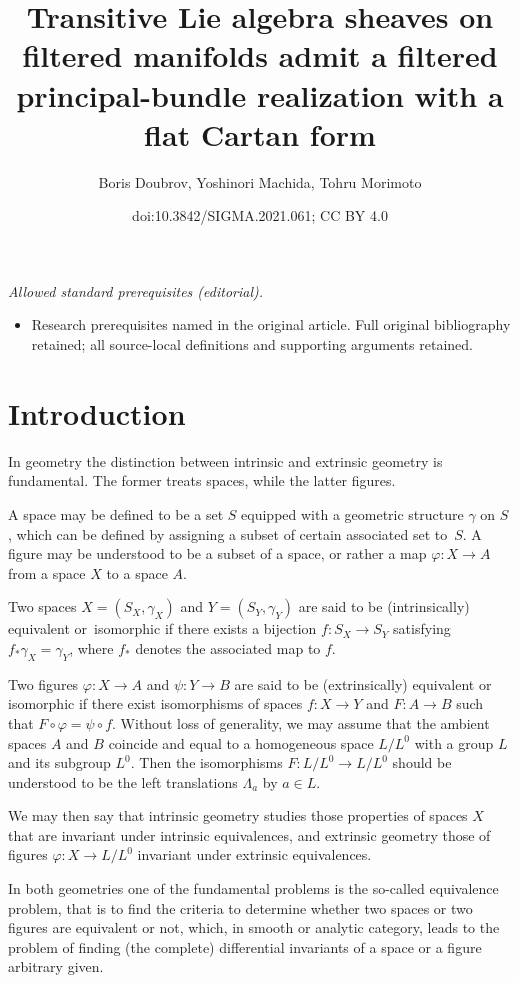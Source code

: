 \documentclass[10pt,a4paper]{amsart}
\title{Transitive Lie algebra sheaves on filtered manifolds admit a filtered principal-bundle realization with a flat Cartan form}
\author{Boris Doubrov, Yoshinori Machida, Tohru Morimoto}
\date{doi:10.3842/SIGMA.2021.061; CC BY 4.0}
\numberwithin{equation}{section}
\begin{document}
\maketitle
\noindent\textit{Allowed standard prerequisites (editorial).}\begin{itemize}
\item Research prerequisites named in the original article. Full original bibliography retained; all source-local definitions and supporting arguments retained.
\end{itemize}\medskip
\section{Introduction}\label{sec1}

In geometry the distinction between intrinsic and extrinsic geometry is fundamental. The former treats spaces, while the latter figures.

A space may be defined to be a set $S$ equipped with a geometric structure $\gamma$ on $S$, which can be defined by assigning a subset of certain associated set to~$S$. A figure may be understood to be a subset of a space, or rather a map $\varphi \colon X \to A $ from a space $X$ to a space $A$.

Two spaces $X =(S_X, \gamma_X) $ and $Y =(S_Y, \gamma_Y) $ are said to be (intrinsically) equivalent or~iso\-mor\-phic if there exists a bijection $f\colon S_X \to S_Y $ satisfying $f_* \gamma_X= \gamma_Y$, where $f_* $ denotes the associated map to $f$.

Two figures $\varphi\colon X \to A $ and $ \psi\colon Y \to B $ are said to be (extrinsically) equivalent or isomorphic if there exist isomorphisms of spaces $f\colon X \to Y $ and $F\colon A \to B$ such that $ F\circ \varphi = \psi \circ f $. Without loss of generality, we may assume that the ambient spaces
$A$ and $B$ coincide and equal to a homogeneous space $L/L^0$ with a group $L$ and its subgroup $L^0$. Then the isomorphisms $F\colon L/L^0 \to L/L^0$
should be understood to be the left translations $\Lambda _a $ by $a \in L$.

We may then say that intrinsic geometry studies those properties of spaces $X$ that are invariant under intrinsic equivalences, and extrinsic geometry those of figures $\varphi\colon X \to L/L^0$ invariant under extrinsic equivalences.

In both geometries one of the fundamental problems is the so-called equivalence problem, that is to find the criteria to determine whether two spaces or two figures are equivalent or not, which, in smooth or analytic category, leads to the problem of finding (the complete) differential invariants of a space or a figure arbitrary given.
\end{document}
